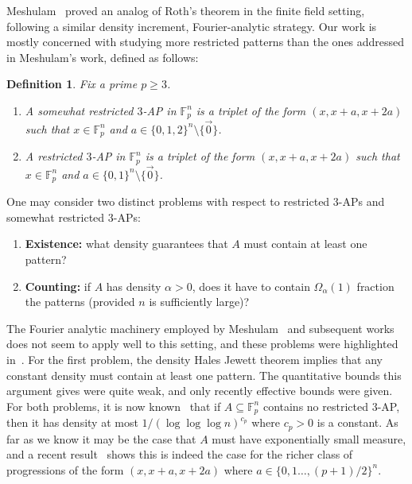 \documentclass[11pt]{article}
\newtheorem{definition}[thm]{Definition}
\renewcommand\geq{\geqslant}
\begin{document}
Meshulam~\cite{Meshulam}  proved an analog of Roth's theorem in the finite field setting, following a similar density increment, Fourier-analytic strategy.
Our work is mostly concerned with studying more restricted patterns than the ones addressed in Meshulam's work, defined as follows:
\begin{definition}
    Fix a prime $p\geq 3$. 
    \begin{enumerate}
        \item A somewhat restricted $3$-AP in $\mathbb{F}_p^n$ is a triplet of the form $(x,x+a,x+2a)$ such that $x\in\mathbb{F}_p^n$ and 
    $a\in\{0,1,2\}^n\setminus\{\vec{0}\}$.
    \item A restricted $3$-AP in $\mathbb{F}_p^n$ is a triplet of the form $(x,x+a,x+2a)$ such that $x\in\mathbb{F}_p^n$ and 
    $a\in\{0,1\}^n\setminus\{\vec{0}\}$.
    \end{enumerate}
    
\end{definition}
One may consider two distinct problems with respect to restricted $3$-APs and somewhat restricted $3$-APs: 
\begin{enumerate}
    \item {\bf Existence:} what density guarantees that $A$ must contain at least one pattern?
    \item {\bf Counting:} if $A$ has density $\alpha>0$, does it have to contain $\Omega_{\alpha}(1)$ fraction the patterns (provided $n$ is sufficiently large)?
\end{enumerate}
The Fourier analytic machinery employed by Meshulam~\cite{Meshulam} and subsequent works does not seem to apply well to this setting, and these problems were highlighted in~\cite{Green,Mos}. For the first problem, the density Hales Jewett theorem implies that any constant density must contain at least one pattern. The quantitative bounds this argument gives were quite weak, and only recently effective bounds were given. For both problems, it is now known~\cite{BKM3AP,BKLMDHJ} that if  $A\subseteq\mathbb{F}_p^n$ contains no restricted $3$-AP, then it has density at most $1/(\log\log\log n)^{c_p}$ where $c_p>0$ is a constant. As far as we know it may be the case that $A$ must have exponentially small measure, and a recent result~\cite{conlon2026note} shows this is indeed the case for the richer class of progressions of the form $(x,x+a,x+2a)$ where $a\in \{0,1\ldots, (p+1)/2\}^n$.
\end{document}
